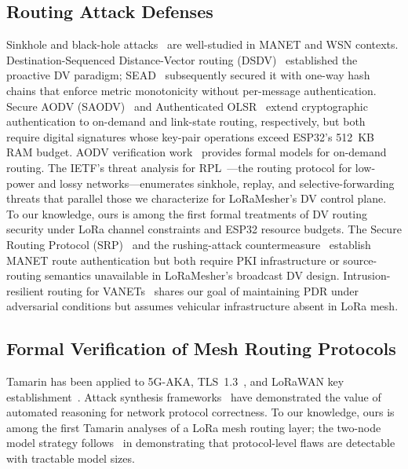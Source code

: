 \documentclass[preprint,12pt]{elsarticle}
\begin{document}
\subsection{Routing Attack Defenses}

Sinkhole and black-hole attacks~\cite{ahmad2024-sinkhole-reputation,
ieee2025-blackhole-optimization,klenze2021-forwarding}
are well-studied in MANET and WSN contexts.
Destination-Sequenced Distance-Vector routing
(DSDV)~\cite{perkins1994-dsdv} established the proactive DV paradigm;
SEAD~\cite{hu2002-sead} subsequently secured it with one-way hash
chains that enforce metric monotonicity without per-message
authentication.
Secure AODV (SAODV)~\cite{zapata2002-saodv} and Authenticated
OLSR~\cite{raffo2004-authenticated-olsr} extend cryptographic
authentication to on-demand and link-state routing, respectively,
but both require digital signatures whose key-pair operations exceed
ESP32's 512~KB RAM budget.
AODV verification work~\cite{glabbeek2016-aodv-verification}
provides formal models for on-demand routing.
The IETF's threat analysis for RPL~\cite{ietf-rfc7416}—the routing
protocol for low-power and lossy networks—enumerates sinkhole,
replay, and selective-forwarding threats that parallel those we
characterize for LoRaMesher's DV control plane.
To our knowledge, ours is among the first formal treatments of DV routing
security under LoRa channel constraints and ESP32 resource budgets.
The Secure Routing Protocol (SRP)~\cite{papadimitratos2002-srp} and the rushing-attack countermeasure~\cite{hu2003-rushing} establish MANET route authentication but both require PKI infrastructure or source-routing semantics unavailable in LoRaMesher's broadcast DV design.
Intrusion-resilient routing for VANETs~\cite{springer2026-vanet-routing}
shares our goal of maintaining PDR under adversarial conditions
but assumes vehicular infrastructure absent in LoRa mesh.

\subsection{Formal Verification of Mesh Routing Protocols}

Tamarin has been applied to 5G-AKA, TLS~1.3~\cite{basin2025-tamarin-book},
and LoRaWAN key establishment~\cite{ieee2025-lorawan-key-verification}.
Attack synthesis frameworks~\cite{ginesin2024-sctp-formal,pereira2025-router-verification,song2026-protocolguard}
have demonstrated the value of automated reasoning for
network protocol correctness.
To our knowledge, ours is among the first Tamarin analyses of a LoRa
mesh routing layer; the two-node model strategy follows~\cite{ieee2025-lorawan-key-verification,
shen2026-wifi-security} in demonstrating that
protocol-level flaws are detectable with tractable model sizes.
\end{document}
